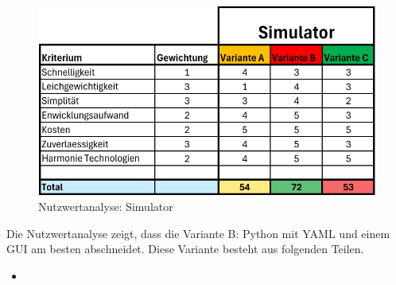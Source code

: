 \begin{figure}[H]
\centering
\includegraphics[width=\textwidth]{assets/Nutzwertanalyse-Simulator.pdf}
\caption{Nutzwertanalyse: Simulator}
\label{fig:nutzwert-simulator}
\end{figure}

Die Nutzwertanalyse zeigt, dass die Variante B: Python mit YAML und einem GUI am besten abschneidet. Diese Variante besteht aus folgenden Teilen.

\begin{itemize}
    \item 
\end{itemize}